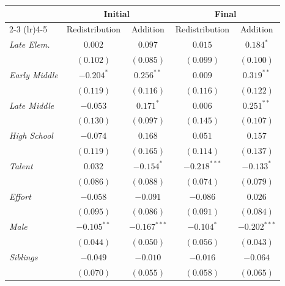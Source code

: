 
\begin{table}[H]
\begin{center}
\begin{footnotesize}
\begin{tabular}{l c c c c}
\toprule
 & \multicolumn{2}{c}{Initial} & \multicolumn{2}{c}{Final} \\
\cmidrule(lr){2-3} \cmidrule(lr){4-5}
 & Redistribution & Addition & Redistribution & Addition \\
\midrule
\textit{Late Elem.}   & $0.002$       & $0.097$        & $0.015$        & $0.184^{*}$    \\
                      & $(0.102)$     & $(0.085)$      & $(0.099)$      & $(0.100)$      \\
\textit{Early Middle} & $-0.204^{*}$  & $0.256^{**}$   & $0.009$        & $0.319^{**}$   \\
                      & $(0.119)$     & $(0.116)$      & $(0.116)$      & $(0.122)$      \\
\textit{Late Middle}  & $-0.053$      & $0.171^{*}$    & $0.006$        & $0.251^{**}$   \\
                      & $(0.130)$     & $(0.097)$      & $(0.145)$      & $(0.107)$      \\
\textit{High School}  & $-0.074$      & $0.168$        & $0.051$        & $0.157$        \\
                      & $(0.119)$     & $(0.165)$      & $(0.114)$      & $(0.137)$      \\
\textit{Talent}       & $0.032$       & $-0.154^{*}$   & $-0.218^{***}$ & $-0.133^{*}$   \\
                      & $(0.086)$     & $(0.088)$      & $(0.074)$      & $(0.079)$      \\
\textit{Effort}       & $-0.058$      & $-0.091$       & $-0.086$       & $0.026$        \\
                      & $(0.095)$     & $(0.086)$      & $(0.091)$      & $(0.084)$      \\
\textit{Male}         & $-0.105^{**}$ & $-0.167^{***}$ & $-0.104^{*}$   & $-0.202^{***}$ \\
                      & $(0.044)$     & $(0.050)$      & $(0.056)$      & $(0.043)$      \\
\textit{Siblings}     & $-0.049$      & $-0.010$       & $-0.016$       & $-0.064$       \\
                      & $(0.070)$     & $(0.055)$      & $(0.058)$      & $(0.065)$      \\

\end{tabular}
\end{footnotesize}
\end{center}
\end{table}
